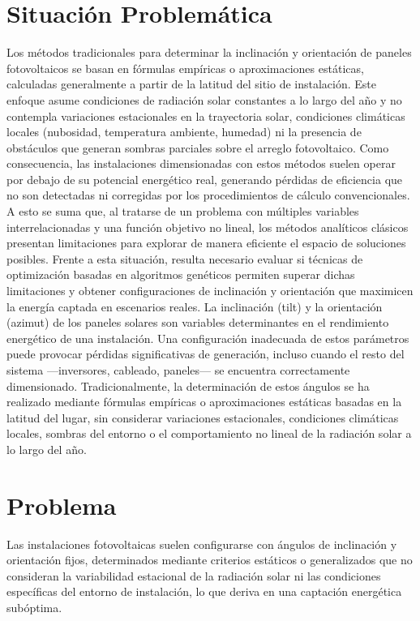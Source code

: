 \documentclass[12pt, a4paper]{article}
\begin{document}
\section{Situación Problemática}
Los métodos tradicionales para determinar la inclinación y orientación de paneles fotovoltaicos se basan en fórmulas empíricas o aproximaciones estáticas, calculadas generalmente a partir de la latitud del sitio de instalación. Este enfoque asume condiciones de radiación solar constantes a lo largo del año y no contempla variaciones estacionales en la trayectoria solar, condiciones climáticas locales (nubosidad, temperatura ambiente, humedad) ni la presencia de obstáculos que generan sombras parciales sobre el arreglo fotovoltaico. Como consecuencia, las instalaciones dimensionadas con estos métodos suelen operar por debajo de su potencial energético real, generando pérdidas de eficiencia que no son detectadas ni corregidas por los procedimientos de cálculo convencionales. A esto se suma que, al tratarse de un problema con múltiples variables interrelacionadas y una función objetivo no lineal, los métodos analíticos clásicos presentan limitaciones para explorar de manera eficiente el espacio de soluciones posibles. Frente a esta situación, resulta necesario evaluar si técnicas de optimización basadas en algoritmos genéticos permiten superar dichas limitaciones y obtener configuraciones de inclinación y orientación que maximicen la energía captada en escenarios reales. La inclinación (tilt) y la orientación (azimut) de los paneles solares son variables determinantes en el rendimiento energético de una instalación. Una configuración inadecuada de estos parámetros puede provocar pérdidas significativas de generación, incluso cuando el resto del sistema —inversores, cableado, paneles— se encuentra correctamente dimensionado. Tradicionalmente, la determinación de estos ángulos se ha realizado mediante fórmulas empíricas o aproximaciones estáticas basadas en la latitud del lugar, sin considerar variaciones estacionales, condiciones climáticas locales, sombras del entorno o el comportamiento no lineal de la radiación solar a lo largo del año.

\section{Problema}
Las instalaciones fotovoltaicas suelen configurarse con ángulos de inclinación y orientación fijos, determinados mediante criterios estáticos o generalizados que no consideran la variabilidad estacional de la radiación solar ni las condiciones específicas del entorno de instalación, lo que deriva en una captación energética subóptima.
\end{document}
